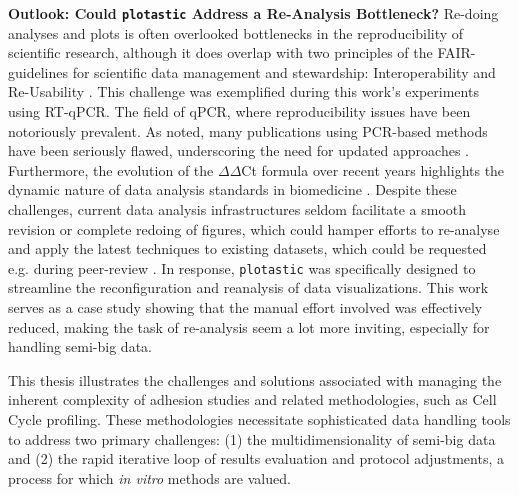 \textbf{Outlook: Could \texttt{plotastic} Address a Re-Analysis Bottleneck?}
Re-doing analyses and plots is often overlooked bottlenecks in the
reproducibility of scientific research, although it does overlap with two
principles of the FAIR-guidelines for scientific data management and
stewardship: Interoperability and Re-Usability
\cite{wilkinsonFAIRGuidingPrinciples2016}. This challenge was exemplified during
this work's experiments using RT-qPCR. The field of qPCR, where reproducibility
issues have been notoriously prevalent. As
\citet{bustinReproducibilityBiomedicalResearch2014} noted, many publications
using PCR-based methods have been seriously flawed, underscoring the need for
updated approaches \cite{bustinNeedTransparencyGood2013,
    ruiz-villalbaUseMisuseCq2021}. Furthermore, the evolution of the
$\Delta\Delta$Ct formula over recent years highlights the dynamic nature of data
analysis standards in biomedicine \cite{pfafflNewMathematicalModel2001a,
    ramakersAssumptionfreeAnalysisQuantitative2003,
    ruijterEfficiencyCorrectionRequired2021}. Despite these challenges, current data
analysis infrastructures seldom facilitate a smooth revision or complete redoing
of figures, which could hamper efforts to re-analyse and apply the latest
techniques to existing datasets, which could be requested e.g. during
peer-review \cite{wilkinsonFAIRGuidingPrinciples2016}. In response,
\texttt{plotastic} was specifically designed to streamline the reconfiguration
and reanalysis of data visualizations. This work serves as a case study showing
that  the manual effort
involved was effectively reduced, making the task of re-analysis seem a lot more
inviting, especially for handling semi-big data.





%
\label{sec:discussion_conclusion_semi_automation}%
This thesis illustrates the challenges and solutions associated with managing
the inherent complexity of adhesion studies and related methodologies, such as
Cell Cycle profiling. These methodologies necessitate sophisticated data
handling tools to address two primary challenges: (1) the multidimensionality of
semi-big data and (2) the rapid iterative loop of results evaluation and protocol
adjustments, a process for which \textit{in vitro} methods are valued.

